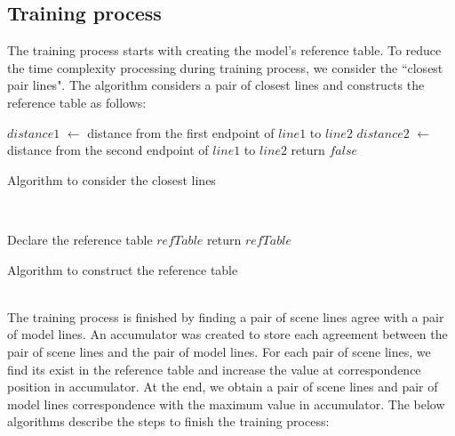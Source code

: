 \subsection{Training process}
The training process starts with creating the model's reference table. To reduce the time complexity processing during training process, we consider the ``closest pair lines". The algorithm considers a pair of closest lines and constructs the reference table as follows:\\[0.2cm]
\begin{algorithm}[H]
\Indm 
{}
\SetAlgoLined
{}
\Indp
$distance1$ $\leftarrow$ distance from the first endpoint of $line1$ to $line2$\;
$distance2$ $\leftarrow$  distance from the second endpoint of $line1$ to $line2$\;
return $false$\;
\caption{Algorithm to consider the closest lines}
\end{algorithm}~\\[0.2cm]
\begin{algorithm}[H]
\Indm 
{}
\SetAlgoLined
{}
\Indp
Declare the reference table $refTable$ \;
return $refTable$ \;
\caption{Algorithm to construct the reference table}
\end{algorithm}~\\
The training process is finished by finding a pair of scene lines agree with a pair of model lines. An accumulator was created to store each agreement between the pair of scene lines and the pair of model lines. For each pair of scene lines, we find its exist in the reference table and increase the value at correspondence position in accumulator. At the end, we obtain a pair of scene lines and pair of model lines correspondence with the maximum value in accumulator. The below algorithms describe the steps to finish the training process:
